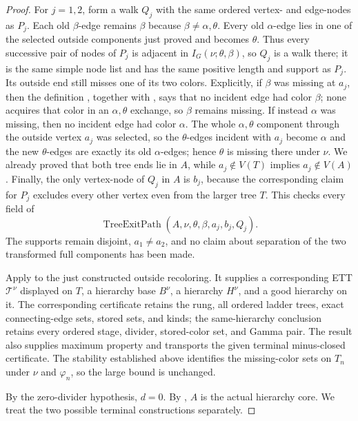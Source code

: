 \begin{proof}
For $j=1,2$, form a walk $Q_j$ with the same ordered vertex- and
edge-nodes as $P_j$.  Each old $\beta$-edge remains $\beta$ because
$\beta\ne\alpha,\theta$.  Every old $\alpha$-edge lies in one of the
selected outside components just proved and becomes $\theta$.  Thus every
successive pair of nodes of $P_j$ is adjacent in
$I_G(\nu;\theta,\beta)$, so $Q_j$ is a walk there; it is the same simple
node list and has the same positive length and support as $P_j$.
Its outside end still misses one of its two colors.  Explicitly, if
$\beta$ was missing at $a_j$, then the definition
, together with , says
that no incident edge had color $\beta$; none acquires that color in an
$\alpha,\theta$ exchange, so $\beta$ remains missing.  If instead
$\alpha$ was missing, then no incident edge had color $\alpha$.  The
whole $\alpha,\theta$ component through the outside vertex $a_j$ was
selected, so the $\theta$-edges incident with $a_j$ become $\alpha$ and
the new $\theta$-edges are exactly its old $\alpha$-edges; hence $\theta$
is missing there under $\nu$.  We already proved that both tree ends lie
in $A$, while $a_j\notin V(T)$ implies $a_j\notin V(A)$.  Finally, the
only vertex-node of $Q_j$ in $A$ is $b_j$, because the corresponding
claim for $P_j$ excludes every other vertex even from the larger tree
$T$.  This checks every field of
\[
       \operatorname{TreeExitPath}(A,\nu,\theta,\beta,a_j,b_j,Q_j).
       \tag{1}
\]
The supports remain disjoint, $a_1\ne a_2$, and no claim about separation
of the two transformed full components has been made.

Apply  to the just constructed outside
recoloring.  It supplies a corresponding ETT $\mathcal T^\nu$ displayed
on $T$, a hierarchy base $B^\nu$, a hierarchy $H^\nu$, and a good
hierarchy on it.  The corresponding certificate retains the rung, all
ordered ladder trees, exact connecting-edge sets, stored sets, and kinds;
the same-hierarchy conclusion retains every ordered stage, divider,
stored-color set, and Gamma pair.  The result also supplies maximum
property and transports the given terminal minus-closed certificate.
The stability established above identifies the missing-color sets on
$T_n$ under $\nu$ and $\varphi_n$, so the large bound is unchanged.

By the zero-divider hypothesis, $d=0$.  By , $A$ is the
actual hierarchy core.  We treat the two possible terminal constructions
separately.


\end{proof}
